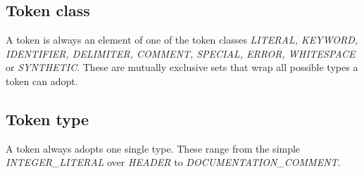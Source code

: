 \subsection{Token class}
A token is always an element of one of the token classes \textit{LITERAL, KEYWORD, IDENTIFIER, DELIMITER, COMMENT, SPECIAL, ERROR, WHITESPACE} or \textit{SYNTHETIC}. These are mutually exclusive sets that wrap all possible types a token can adopt.

\subsection{Token type}
A token always adopts one single type. These range from the simple \textit{INTEGER\_LITERAL} over \textit{HEADER} to \textit{DOCUMENTATION\_COMMENT}.
